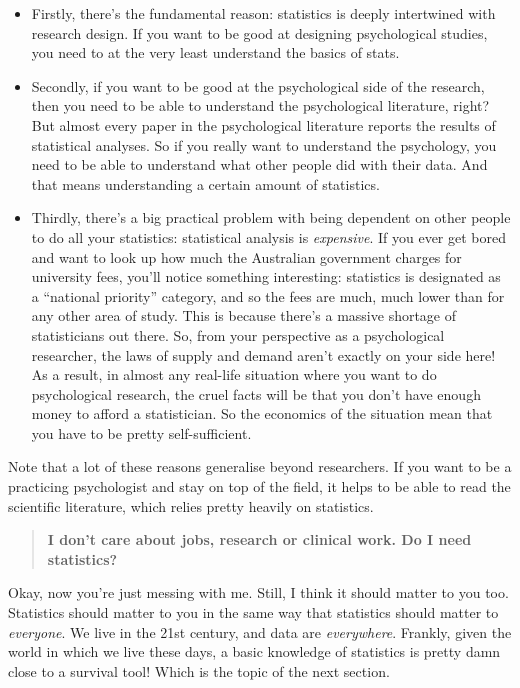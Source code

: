 \documentclass[
  a4paper,
]{book}
\providecommand{\tightlist}{%
  \setlength{\itemsep}{0pt}\setlength{\parskip}{0pt}}
\begin{document}
\begin{itemize}
\tightlist
\item
  Firstly, there's the fundamental reason: statistics is deeply
  intertwined with research design. If you want to be good at designing
  psychological studies, you need to at the very least understand the
  basics of stats.
\item
  Secondly, if you want to be good at the psychological side of the
  research, then you need to be able to understand the psychological
  literature, right? But almost every paper in the psychological
  literature reports the results of statistical analyses. So if you
  really want to understand the psychology, you need to be able to
  understand what other people did with their data. And that means
  understanding a certain amount of statistics.
\item
  Thirdly, there's a big practical problem with being dependent on other
  people to do all your statistics: statistical analysis is
  \emph{expensive}. If you ever get bored and want to look up how much
  the Australian government charges for university fees, you'll notice
  something interesting: statistics is designated as a ``national
  priority'' category, and so the fees are much, much lower than for any
  other area of study. This is because there's a massive shortage of
  statisticians out there. So, from your perspective as a psychological
  researcher, the laws of supply and demand aren't exactly on your side
  here! As a result, in almost any real-life situation where you want to
  do psychological research, the cruel facts will be that you don't have
  enough money to afford a statistician. So the economics of the
  situation mean that you have to be pretty self-sufficient.
\end{itemize}

Note that a lot of these reasons generalise beyond researchers. If you
want to be a practicing psychologist and stay on top of the field, it
helps to be able to read the scientific literature, which relies pretty
heavily on statistics.

\begin{quote}
\textbf{I don't care about jobs, research or clinical work. Do I need
statistics?}
\end{quote}

Okay, now you're just messing with me. Still, I think it should matter
to you too. Statistics should matter to you in the same way that
statistics should matter to \emph{everyone}. We live in the 21st
century, and data are \emph{everywhere}. Frankly, given the world in
which we live these days, a basic knowledge of statistics is pretty damn
close to a survival tool! Which is the topic of the next section.
\end{document}
